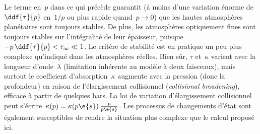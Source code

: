 \sk
Le terme en~$p$ dans ce qui précède guarantit (à moins d'une variation énorme de $\ddf{\tau}{p}$ en~$1/p$ ou plus rapide quand~$p \rightarrow 0$) que les hautes atmosphères planétaires sont toujours stables. De plus, les atmosphères optiquement fines sont toujours stables sur l'intégralité de leur épaisseur, puisque~$-p \, \ddf{\tau}{p} < \tau_\infty \ll 1$. Le critère de stabilité est en pratique un peu plus complexe qu'indiqué dans les atmosphères réelles. Bien sûr, $\tau$ et~$\kappa$ varient avec la longueur d'onde~$\lambda$ (limitation inhérente au modèle à deux faisceaux), mais surtout le coefficient d'absorption~$\kappa$ augmente avec la pression (donc la profondeur) en raison de l'élargissement collisionnel (\emph{collisional broadening}), efficace à partir de quelques bars. La loi de variation d'élargissement collisionnel peut s'écrire~$\kappa(p) = \kappa(p\e{s}) \, \frac{p}{p\e{s}}$. Les processus de changements d'état sont également susceptibles de rendre la situation plus complexe que le calcul proposé ici.




